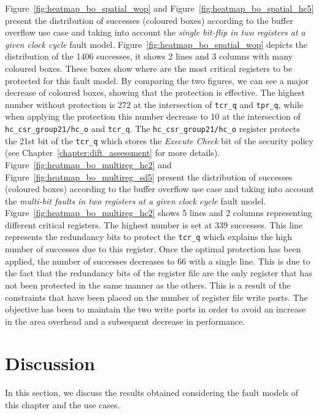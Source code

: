Figure~\ref{fig:heatmap_bo_spatial_wop} and Figure~\ref{fig:heatmap_bo_spatial_hc5} present the distribution of successes (coloured boxes) according to the buffer overflow use case and taking into account the \textit{single bit-flip in two registers at a given clock cycle} fault model. Figure~\ref{fig:heatmap_bo_spatial_wop} depicts the distribution of the 1406 successes, it shows 2 lines and 3 columns with many coloured boxes. These boxes show where are the most critical registers to be protected for this fault model. By comparing the two figures, we can see a major decrease of coloured boxes, showing that the protection is effective. The highest number without protection is 272 at the intersection of \texttt{tcr\_q} and \texttt{tpr\_q}, while when applying the protection this number decrease to 10 at the intersection of \texttt{hc\_csr\_group21/hc\_o} and \texttt{tcr\_q}. The \texttt{hc\_csr\_group21/hc\_o} register protects the 21st bit of the \texttt{tcr\_q} which stores the \textit{Execute Check} bit of the security policy (see Chapter~\ref{chapter:dift_assessment} for more details).
Figure~\ref{fig:heatmap_bo_multireg_hc2} and Figure~\ref{fig:heatmap_bo_multireg_sd5} present the distribution of successes (coloured boxes) according to the buffer overflow use case and taking into account the \textit{multi-bit faults in two registers at a given clock cycle} fault model. Figure~\ref{fig:heatmap_bo_multireg_hc2} shows 5 lines and 2 columns representing different critical registers. The highest number is set at 339 successes. This line represents the redundancy bits to protect the \texttt{tcr\_q} which explains the high number of successes due to this register. Once the optimal protection has been applied, the number of successes decreases to 66 with a single line. This is due to the fact that the redundancy bits of the register file are the only register that has not been protected in the same manner as the others. This is a result of the constraints that have been placed on the number of register file write ports. The objective has been to maintain the two write ports in order to avoid an increase in the area overhead and a subsequent decrease in performance.

\section{Discussion}
\label{section:chap6_discussion}

In this section, we discuss the results obtained considering the fault models of this chapter and the use cases.

